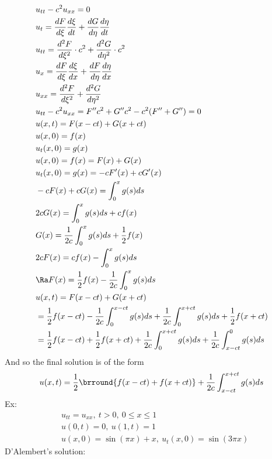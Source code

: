 \begin{align*}
    &u_{tt}-c^2u_{xx}=0\\
    &u_t=\frac{dF}{d\xi}\frac{d\xi}{dt}+\frac{dG}{d\eta}\frac{d\eta}{dt}\\
    &u_{tt}=\frac{d^2F}{d\xi^2}\cdot c^2+\frac{d^2G}{d\eta^2}\cdot c^2\\
    &u_x=\frac{dF}{d\xi}\frac{d\xi}{dx}+\frac{dF}{d\eta}\frac{d\eta}{dx}\\
    &u_{xx}=\frac{d^2F}{d\xi^2}+\frac{d^2G}{d\eta^2}\\
    &u_{tt}-c^2u_{xx}=F''c^2+G''c^2-c^2(F''+G'')=0\\
    &u(x,t)=F(x-ct)+G(x+ct)\\
    &u(x,0)=f(x)\\
    &u_t(x,0)=g(x)\\
    &u(x,0)=f(x)=F(x)+G(x)\\
    &u_t(x,0)=g(x)=-cF'(x)+cG'(x)\\
    &-cF(x)+cG(x)=\int_0^x g(s)ds\\
    &2cG(x)=\int_0^xg(s)ds+cf(x)\\
    &G(x)=\frac{1}{2c}\int_0^xg(s)ds+\frac{1}{2}f(x)\\
    &2cF(x)=cf(x)-\int_0^x g(s)ds\\
    &\Ra F(x)=\frac{1}{2}f(x)-\frac{1}{2c}\int_0^x g(s)ds\\
    &u(x,t)=F(x-ct)+G(x+ct)\\
    &=\frac{1}{2}f(x-ct)-\frac{1}{2c}\int_0^{x-ct}g(s)ds+\frac{1}{2c}\int_0^{x+ct}g(s)ds+\frac{1}{2}f(x+ct)\\
    &=\frac{1}{2}f(x-ct)+\frac{1}{2}f(x+ct)+\frac{1}{2c}\int_0^{x+ct}g(s)ds+\frac{1}{2c}\int_{x-ct}^0 g(s)ds
\end{align*}
And so the final solution is of the form
$$u(x,t)=\frac{1}{2}\brround{f(x-ct)+f(x+ct)}+\frac{1}{2c}\int_{x-ct}^{x+ct}g(s)ds$$
Ex:
\begin{align*}
    &u_{tt}=u_{xx},\ t>0,\ 0\leq x\leq 1\\
    &u(0,t)=0,\ u(1,t)=1\\
    &u(x,0)=\sin(\pi x)+x,\ u_t(x,0)=\sin(3\pi x)
\end{align*}
D'Alembert's solution:
